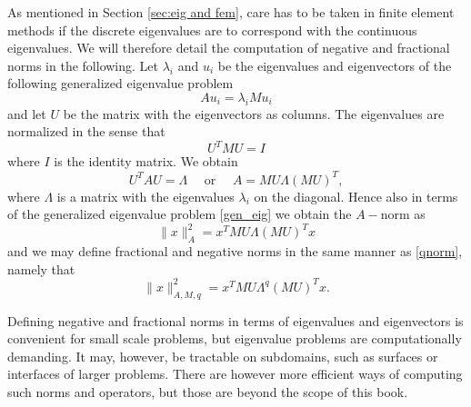 As mentioned in Section \ref{sec:eig and fem}, 
care has to be taken in finite element methods if the discrete eigenvalues
are to correspond with the continuous eigenvalues. We will therefore detail
the computation of negative and fractional norms in the following.   
Let $\lambda_i$ and $u_i$ be the eigenvalues and eigenvectors of the following
generalized eigenvalue problem  
\begin{equation}
\label{gen_eig}
A u_i = \lambda_i M u_i 
\end{equation}
and let $U$ be the matrix with the eigenvectors as columns. 
The eigenvalues are normalized in the sense 
that 
\[
U^T M U = I 
\]
where $I$ is the identity matrix. 
We obtain 
\[
U^T A U = \Lambda \quad \mbox{ or } \quad A = M U \Lambda (M U)^T  ,  
\]
where $\Lambda$ is a matrix with the eigenvalues $\lambda_i$ on the diagonal.  
Hence also in terms of the generalized eigenvalue problem \eqref{gen_eig}
we obtain the $A-$norm as  
\[
\|x\|^2_A = x^T MU \Lambda (MU)^T x   
\]
and  
we may define fractional and negative norms in the same manner
as \eqref{qnorm}, namely that 
\[
\|x\|^2_{A,M,q} = x^T M U \Lambda^q (MU)^T x .     
\]

Defining negative and fractional norms in terms of eigenvalues and eigenvectors 
is convenient for small scale problems, but eigenvalue problems are computationally
demanding. It may, however, be tractable on subdomains, such as surfaces or interfaces 
of larger problems. There are however more    
efficient ways of computing such norms and operators, but those are beyond the scope of this
book. 



